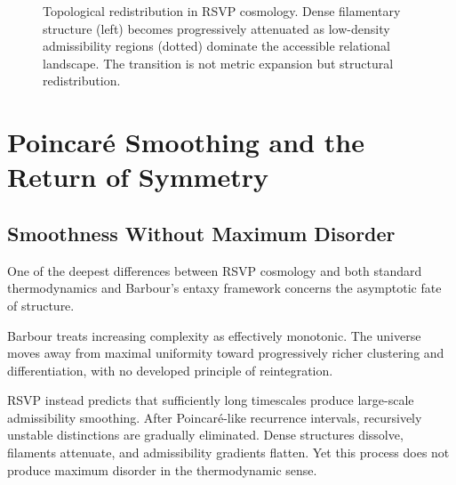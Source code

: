 \documentclass[12pt, a4paper]{article}
\begin{document}
\begin{figure}[H]
\centering
{}
\caption{Topological redistribution in RSVP cosmology. Dense filamentary
structure (left) becomes progressively attenuated as low-density
admissibility regions (dotted) dominate the accessible relational landscape.
The transition is not metric expansion but structural redistribution.}
\end{figure}

\section{Poincar\'e Smoothing and the Return of Symmetry}

\subsection{Smoothness Without Maximum Disorder}

One of the deepest differences between RSVP cosmology and both standard
thermodynamics and Barbour's entaxy framework concerns the asymptotic fate
of structure.

Barbour treats increasing complexity as effectively monotonic. The universe
moves away from maximal uniformity toward progressively richer clustering
and differentiation, with no developed principle of reintegration.

RSVP instead predicts that sufficiently long timescales produce large-scale
admissibility smoothing. After Poincar\'{e}-like recurrence intervals,
recursively unstable distinctions are gradually eliminated. Dense structures
dissolve, filaments attenuate, and admissibility gradients flatten. Yet
this process does not produce maximum disorder in the thermodynamic sense.
\end{document}
